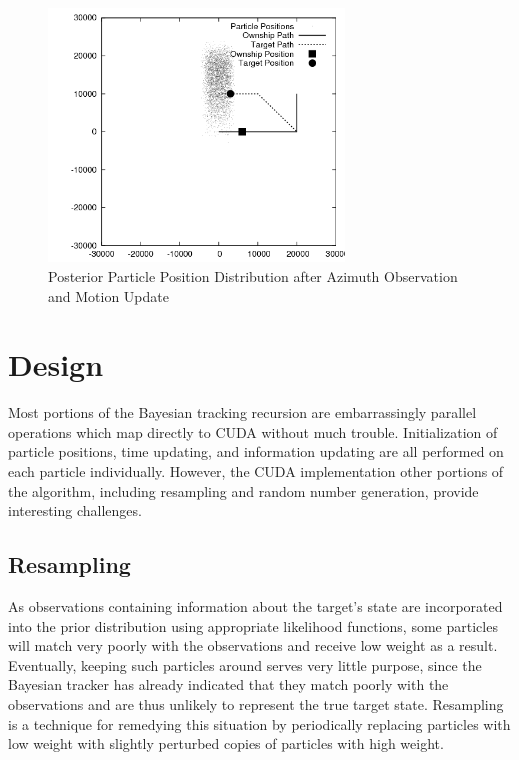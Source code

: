 \documentclass{article}
\begin{document}
\begin{figure}
\centering
\includegraphics[width=0.7\textwidth]{data/particles_motion.png}
\caption{Posterior Particle Position Distribution after Azimuth Observation and Motion Update}
\label{posterior2}
\end{figure}

\section{Design}
Most portions of the Bayesian tracking recursion are embarrassingly parallel operations which map directly to CUDA without much trouble. Initialization of particle positions, time updating, and information updating are all performed on each particle individually. However, the CUDA implementation other portions of the algorithm, including resampling and random number generation, provide interesting challenges.

\subsection{Resampling}\label{Resampling}
As observations containing information about the target's state are incorporated into the prior distribution using appropriate likelihood functions, some particles will match very poorly with the observations and receive low weight as a result. Eventually, keeping such particles around serves very little purpose, since the Bayesian tracker has already indicated that they match poorly with the observations and are thus unlikely to represent the true target state. Resampling is a technique for remedying this situation by periodically replacing particles with low weight with slightly perturbed copies of particles with high weight.
\end{document}
